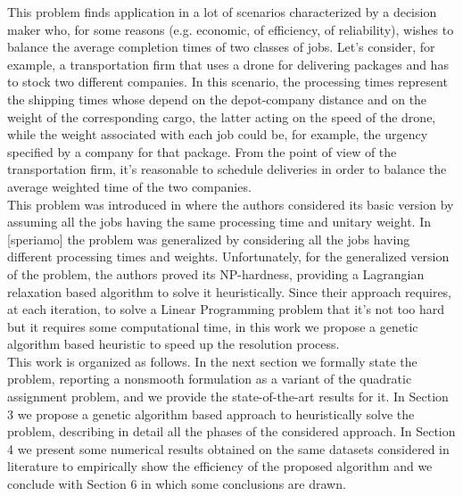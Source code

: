 \documentclass[opre,nonblindrev]{informs3} %
\begin{document}
This problem finds application in a lot of scenarios characterized by a decision maker who, for some reasons (e.g. economic, of efficiency, of reliability), wishes to balance the average completion times of two classes of jobs. Let’s consider, for example, a transportation firm that uses a drone for delivering packages and has to stock two different companies. In this scenario, the processing times represent the shipping times whose depend on the depot-company distance and on the weight of the corresponding cargo, the latter acting on the speed of the drone, while the weight associated with each job could be, for example, the urgency specified by a company for that package. From the point of view of the transportation firm, it’s reasonable to schedule deliveries in order to balance the average weighted time of the two companies. \\
This problem was introduced in \cite{av-fud20} where the authors considered its basic version by assuming all the jobs having the same processing time and unitary weight. In [speriamo] the problem was generalized by considering all the jobs having different processing times and weights. Unfortunately, for the generalized version of the problem, the authors proved its NP-hardness, providing a Lagrangian relaxation based algorithm to solve it heuristically. Since their approach requires, at each iteration, to solve a Linear Programming problem that it's not too hard but it requires some computational time, in this work we propose a genetic algorithm based heuristic to speed up the resolution process.\\
This work is organized as follows. In the next section we formally state the problem, reporting a nonsmooth formulation as a variant of the quadratic assignment problem, and we provide the state-of-the-art results for it. In Section 3 we propose a genetic algorithm based approach to heuristically solve the problem, describing in detail all the phases of the considered approach. In Section 4 we present some numerical results obtained on the same datasets considered in literature to empirically show the efficiency of the proposed algorithm and we conclude with Section 6 in which some conclusions are drawn.
\end{document}
